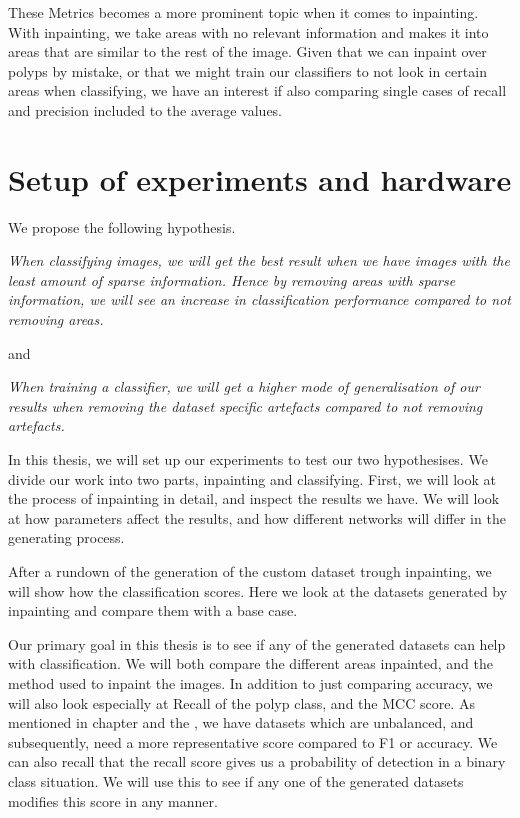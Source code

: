 These Metrics becomes a more prominent topic when it comes to inpainting. With inpainting, we take areas with no relevant information and makes it into areas that are similar to the rest of the image. Given that we can inpaint over polyps by mistake, or that we might train our classifiers to not look in certain areas when classifying, we have an interest if also comparing single cases of recall and precision included to the average values.






\section{Setup of experiments and hardware}
We propose the following hypothesis.
\vspace{10px}

\textit{
When classifying images, we will get the best result when we have images with the least amount of sparse information. 
Hence by removing areas with sparse information,
we will see an increase in classification performance compared to not removing areas.
}

\vspace{5px}
and

\vspace{5px}
\textit{
When training a classifier, we will get a higher
mode of generalisation of our results when removing the dataset
specific artefacts compared to not removing artefacts.}
\vspace{5px}

In this thesis, we will set up our experiments to test our two hypothesises. 
We divide our work into two parts, inpainting and classifying. 
First, we will look at the process of inpainting in detail, and inspect the results we have.  
We will look at how parameters affect the results, and how different networks will differ in the generating process. 


After a rundown of the generation of the custom dataset trough inpainting, we will show how the classification scores. Here we look at the datasets generated by inpainting and compare them with a base case. 

Our primary goal in this thesis is to see if any of the generated datasets can help with classification. We will both compare the different areas inpainted, and the method used to inpaint the images. 
In addition to just comparing accuracy, we will also look especially at Recall of the polyp class, and the MCC score. 
As mentioned in chapter  and the , we have datasets which are unbalanced, and subsequently, need a more representative score compared to F1 or accuracy. 
We can also recall that the recall score  gives us a  probability of detection in a binary class situation. We will use this to see if any one of the generated datasets modifies this score in any manner. 

